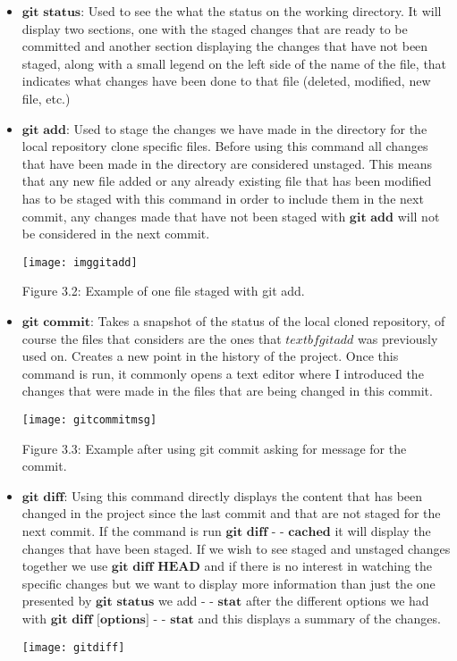 \documentclass{article}
\begin{document}
\begin{itemize}
	\item $\textbf{git status:}$ Used to see the what the status on the working directory. It will display two sections, one with the staged changes that are ready to be committed and another section displaying the changes that have not been staged, along with a small legend on the left side of the name of the file, that indicates what changes have been done to that file (deleted, modified, new file, etc.)

	\item $\textbf{git add:}$ Used to stage the changes we have made in the directory for the local repository clone specific files. Before using this command all changes that have been made in the directory are considered unstaged. This means that any new file added or any already existing file that has been modified has to be staged with this command in order to include them in the next commit, any changes made that have not been staged with $\textbf{git add}$ will not be considered in the next commit.

\begin{center}
	\texttt{[image: imggitadd]}

Figure 3.2: Example of one file staged with git add.
\end{center}

	\item $\textbf{git commit:}$ Takes a snapshot of the status of the local cloned repository, of course the files that considers are the ones that $textbf{git add}$ was previously used on. Creates a new point in the history of the project. Once this command is run, it commonly opens a text editor where I introduced the changes that were made in the files that are being changed in this commit.
\begin{center}
	\texttt{[image: gitcommitmsg]}

Figure 3.3: Example after using git commit asking for message for the commit.
\end{center}

	\item $\textbf{git diff:}$ Using this command directly displays the content that has been changed in the project since the last   commit and that are not staged for the next commit. If the command is run $\textbf{git diff - - cached}$ it will display the changes that have been staged. If we wish to see staged and unstaged changes together we use $\textbf{git diff HEAD}$ and if there is no interest in watching the specific changes but we want to display more information than just the one presented by $\textbf{git status}$ we add $\textbf{- - stat}$ after the different options we had with $\textbf{git diff [options] - - stat}$ and this displays a summary of the changes.
\begin{center}
	\texttt{[image: gitdiff]}


\end{center}
\end{itemize}
\end{document}

